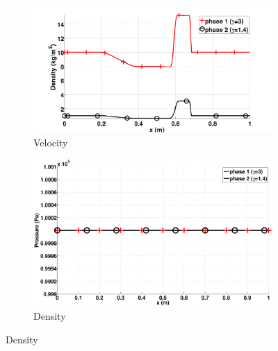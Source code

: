 \documentclass[preprint,10pt]{elsarticle}
\begin{document}
\begin{figure}[H]
        \centering
        \begin{subfigure}[b]{0.495\textwidth}
                \centering
                \includegraphics[width=\textwidth]{figures/relaxation_two_phases_density.png}
                \caption{Velocity}
                \label{fig:adv-vf-vel}
        \end{subfigure}%
        \begin{subfigure}[b]{0.495\textwidth}
                \centering
                \includegraphics[width=\textwidth]{figures/liquid_pressure.eps}
                \caption{Density}
                \label{fig:adv-vf-density}
        \end{subfigure}
        

\end{figure}
\end{document}
